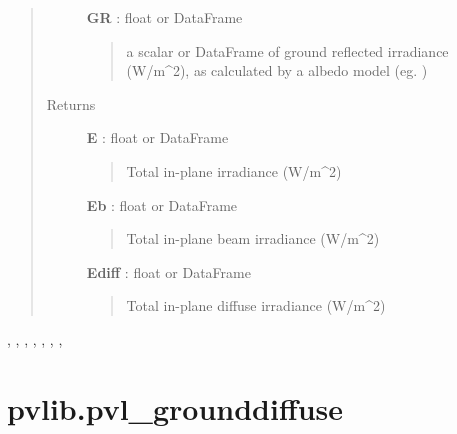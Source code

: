 \documentclass[letterpaper,10pt,english]{sphinxmanual}
\begin{document}
\begin{fulllineitems}
\begin{quote}
\begin{description}
\textbf{GR} : float or DataFrame
\begin{quote}

a scalar or DataFrame of ground reflected irradiance (W/m\textasciicircum{}2), as calculated
by a albedo model (eg. )
\end{quote}

\item[{Returns}] \leavevmode
\textbf{E} : float or DataFrame
\begin{quote}

Total in-plane irradiance (W/m\textasciicircum{}2)
\end{quote}

\textbf{Eb} : float or DataFrame
\begin{quote}

Total in-plane beam irradiance (W/m\textasciicircum{}2)
\end{quote}

\textbf{Ediff} : float or DataFrame
\begin{quote}

Total in-plane diffuse irradiance (W/m\textasciicircum{}2)
\end{quote}

\end{description}\end{quote}




{\hyperref[stubs/pvlib.pvl_grounddiffuse:pvlib.pvl_grounddiffuse]{}}, {\hyperref[stubs/pvlib.pvl_getaoi:pvlib.pvl_getaoi]{}}, {\hyperref[stubs/pvlib.pvl_perez:pvlib.pvl_perez]{}}, {\hyperref[stubs/pvlib.pvl_reindl1990:pvlib.pvl_reindl1990]{}}, {\hyperref[stubs/pvlib.pvl_klucher1979:pvlib.pvl_klucher1979]{}}, {\hyperref[stubs/pvlib.pvl_haydavies1980:pvlib.pvl_haydavies1980]{}}, {\hyperref[stubs/pvlib.pvl_isotropicsky:pvlib.pvl_isotropicsky]{}}, {\hyperref[stubs/pvlib.pvl_kingdiffuse:pvlib.pvl_kingdiffuse]{}}



\end{fulllineitems}



\section{pvlib.pvl\_grounddiffuse}
\label{stubs/pvlib.pvl_grounddiffuse::doc}\label{stubs/pvlib.pvl_grounddiffuse:pvlib-pvl-grounddiffuse}
\end{document}
